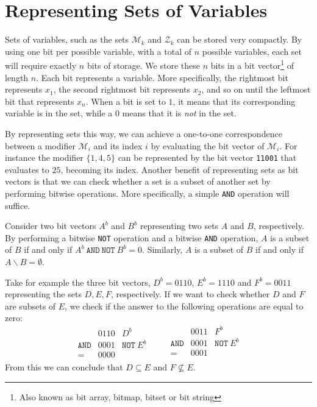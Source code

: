 \section{Representing Sets of Variables}
Sets of variables, such as the sets $\mathcal{M}_k$ and $\mathcal{Z}_k$ can be
stored very compactly.
By using one bit per possible variable, with a total of $n$ possible variables,
each set will require exactly $n$ bits of storage.
We store these $n$ bits in a bit vector\footnote{Also known as bit array,
bitmap, bitset or bit string} of length $n$.
Each bit represents a variable. More specifically, the rightmost bit represents
$x_1$, the second rightmost bit represents $x_2$, and so on until the leftmost
bit that represents $x_n$.
When a bit is set to $1$, it means that its corresponding variable is in
the set, while a $0$ means that it is \emph{not} in the set.

By representing sets this way, we can achieve a one-to-one correspondence
between a modifier $\mathcal{M}_i$ and its index $i$ by evaluating the bit
vector of $\mathcal{M}_i$. For instance the modifier $\{ {1,4,5} \}$ can be
represented by the bit vector \texttt{11001} that evaluates to $25$, becoming
its index. Another benefit of representing sets as bit vectors is
that we can check whether a set is a
subset of another set by performing bitwise operations. More specifically,
a simple \texttt{AND} operation will suffice.

Consider two bit vectors $A^b$ and $B^b$ representing two sets $A$ and
$B$, respectively.
By performing a bitwise \texttt{NOT} operation and a bitwise \texttt{AND}
operation, $A$ is a subset of $B$ if and only if
$A^b~\texttt{AND}~\texttt{NOT}~B^b = 0$.
Similarly, $A$ is a subset of $B$ if and only if $A \backslash B = \emptyset$.

Take for example the three bit vectors, $D^b = 0110$, $E^b = 1110$ and
$F^b = 0011$ representing the sets $D, E, F$, respectively.
If we want to check whether $D$ and $F$ are subsets of $E$, we check if the
answer to the following operations are equal to zero:
\[
\begin{array}{lrl}
                 & 0110 & D^b \\
    \texttt{AND} & 0001 & \texttt{NOT}~E^b \\ \hline
    =            & 0000
\end{array}
\qquad
\begin{array}{lrl}
                 & 0011 & F^b \\
    \texttt{AND} & 0001 & \texttt{NOT}~E^b \\ \hline
    =            & 0001 \\
\end{array}
\]
From this we can conclude that $D \subseteq E$ and $F \not\subseteq E$.

